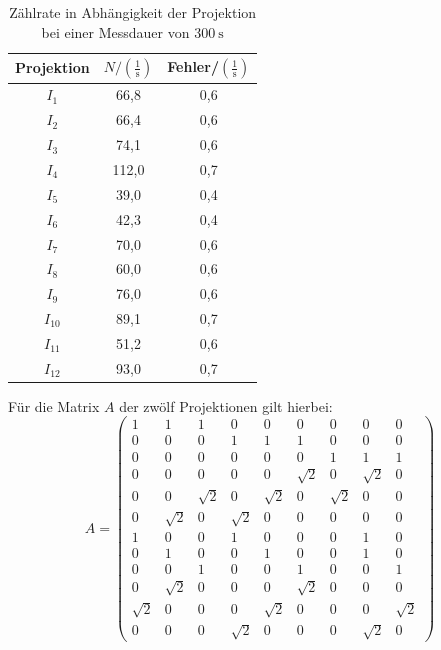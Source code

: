 \begin{table}[H]
  \centering
  \caption{Zählrate in Abhängigkeit der Projektion bei einer Messdauer von $\SI{300}{\second}$}
  \label{tab:mu}
  \begin{tabular}{c c c}
    \toprule
    Projektion & $N/ \left(\mathrm{\frac{1}{s}}\right)$ & Fehler/$\left(\mathrm{\frac{1}{s}}\right)$   \\
    \midrule
        $I_1$    & 66,8  & 0,6    \\
        $I_2$    & 66,4  & 0,6    \\
        $I_3$    & 74,1  & 0,6    \\
        $I_4$    & 112,0 & 0,7    \\
        $I_5$    & 39,0  & 0,4    \\
        $I_6$    & 42,3  & 0,4    \\
        $I_7$    & 70,0  & 0,6    \\
        $I_8$    & 60,0  & 0,6    \\
        $I_9$    & 76,0  & 0,6    \\
        $I_{10}$ & 89,1  & 0,7   \\
        $I_{11}$ & 51,2  & 0,6    \\
        $I_{12}$ & 93,0  & 0,7    \\
    \bottomrule
  \end{tabular}
\end{table}

Für die Matrix $A$ der zwölf Projektionen gilt hierbei:
$$ A =
\left( \begin{matrix}
       1       & 1 &       1 &       0 &        0 &       0 &       0 &       0 &        0      \\
       0       & 0 &       0 &       1 &        1 &       1 &       0 &       0 &        0      \\
       0       & 0 &       0 &       0 &        0 &       0 &       1 &       1 &        1      \\
       0       & 0 &       0 &       0 &        0 &       \sqrt{2}& 0 &       \sqrt{2}&  0      \\
       0       & 0 &       \sqrt{2}& 0 &        \sqrt{2}& 0 &      \sqrt{2}&  0 &       0      \\
       0       & \sqrt{2}& 0 &      \sqrt{2}&   0 &       0 &       0 &       0 &       0      \\
       1       & 0 &       0 &       1 &        0 &       0 &       0 &       1 &       0      \\
       0       & 1 &       0 &       0 &        1 &       0 &       0 &       1 &       0      \\
       0       & 0 &       1 &       0 &        0 &       1 &       0 &       0 &       1      \\
       0       & \sqrt{2}& 0 &       0 &        0 &       \sqrt{2}& 0 &       0 &       0      \\
       \sqrt{2}& 0 &       0 &       0 &        \sqrt{2}& 0 &       0 &       0 &       \sqrt{2}      \\
       0       & 0 &       0 &       \sqrt{2}&  0 &       0 &       0 &       \sqrt{2} & 0
\end{matrix} \right)
$$

